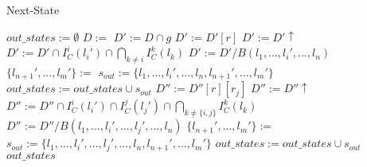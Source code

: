 %	
%
\begin{algorithm}
\caption{Next-State}\label{alg:successor-gen}
\begin{algorithmic}[1]
	\State $out\_states := \emptyset$	
	\State $D := $		
	\State {}
	 \label{lst:line:alllocs}
		 \label{lst:line:alltrans}
			\State $D' := D \cap g$
				 \label{lst:line:normaltrans}
					\State $D' := D'[r]$
					\State $D' := D'\uparrow$
					\State $D' := D' \cap I_C^i(l_i') \cap \bigcap_{k \neq i} I_C^k(l_k)$
						\State $D' := D'/ B(l_1,...,l_i',...,l_n)$
						\State \Call{ReduceZero}{$D'$}
						\State $\{l_{n+1}',...,l_m'\} := $
						\State $s_{out} := \{l_1,...,l_i',...,l_n,l_{n+1}',...,l_m'\}$
						\State $out\_states := out\_states \cup s_{out}$
					\EndIf \label{lst:line:endnormaltrans}
				\Else
					 \label{lst:line:synctrans}
						\label{lst:line:alllocs2}
									\State $D'' := D''[r][r_j]$
									\State $D'' := D''\uparrow$
									\State $D'' := D'' \cap I_C^i(l_i') \cap I_C^j(l_j') \cap \bigcap_{k \neq \{i,j\}} I_C^k(l_k)$
										\State $D''	:= D''/ B(l_1,...,l_i',...,l_j',...,l_n)$						
										\State {}		
										\State $\{l_{n+1}',...,l_m'\} := $
										\State $s_{out} := \{l_1,...,l_i',...,l_j',...,l_n,l_{n+1}',...,l_m'\}$
										\State $out\_states := out\_states \cup s_{out}$
									\EndIf								
								\EndIf							
							\EndFor
						\EndFor \label{lst:line:endsynctrans}
					\EndIf
				\EndIf
			\EndIf
		\EndFor
	\EndFor
	\State \Return $out\_states$
\EndProcedure
\end{algorithmic}
\end{algorithm}


